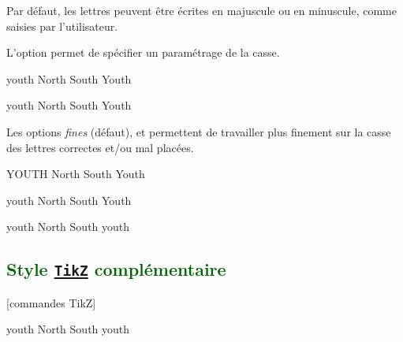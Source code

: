 \documentclass[svgnames]{report}
\newcommand\ctan[1]{\href{https://www.ctan.org/pkg/#1}{\texttt{#1}}}
\newcommand\Section[1]{\subsection{\textcolor{DarkGreen}{#1}}}
\begin{document}
  Par défaut, les lettres peuvent être écrites en majuscule ou en minuscule, comme saisies par l'utilisateur.

  L'option  permet de spécifier un paramétrage de la casse.

  \begin{example}
  \begin{GrilleSutom}[case sensitive=false]{youth} %
    North
    South
    Youth
  \end{GrilleSutom}
  \end{example}

  \begin{example}
  \begin{GrilleSutom}{youth}
    North
    South
    Youth
  \end{GrilleSutom}
  \end{example}

  Les options \textit{fines}  (défaut),  et  permettent de travailler plus finement sur la casse des lettres correctes et/ou mal placées.

  \begin{example}
  \begin{GrilleSutom}{YOUTH}
    North
    South
    Youth
  \end{GrilleSutom}
  \end{example}

  \begin{example}
  \begin{GrilleSutom}{youth}
    North
    South
    Youth
  \end{GrilleSutom}
  \end{example}

  \begin{example}
  \begin{GrilleSutom}{youth} %
    North
    South
    youth
  \end{GrilleSutom}
  \end{example}

  \Section{Style \ctan{TikZ} complémentaire}

  [commandes TikZ]

  \begin{example}
  \begin{GrilleSutom}[
      tikz={framed,
            background rectangle/.style={
              double,ultra thick, draw=SteelBlue
            }
      }]{youth}
    North South youth
  \end{GrilleSutom}
  \end{example}
\end{document}
